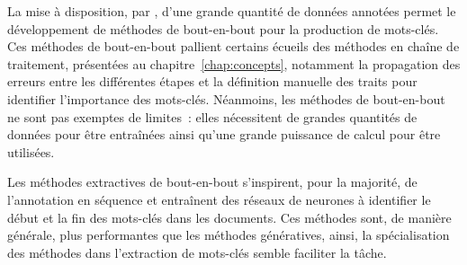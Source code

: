 La mise à disposition, par \citet{meng_deep_2017}, d'une grande quantité de données annotées permet le développement de méthodes de bout-en-bout pour la production de mots-clés.
Ces méthodes de bout-en-bout pallient certains écueils des méthodes en chaîne de traitement, présentées au chapitre~\ref{chap:concepts}, notamment la propagation des erreurs entre les différentes étapes et la définition manuelle des traits pour identifier l'importance des mots-clés.
%
Néanmoins, les méthodes de bout-en-bout ne sont pas exemptes de limites~: elles nécessitent de grandes quantités de données pour être entraînées ainsi qu'une grande puissance de calcul pour être utilisées.

Les méthodes extractives de bout-en-bout s'inspirent, pour la majorité, de l'annotation en séquence et entraînent des réseaux de neurones à identifier le début et la fin des mots-clés dans les documents.
Ces méthodes sont, de manière générale, plus performantes que les méthodes génératives, ainsi, la spécialisation des méthodes dans l'extraction de mots-clés semble faciliter la tâche.


